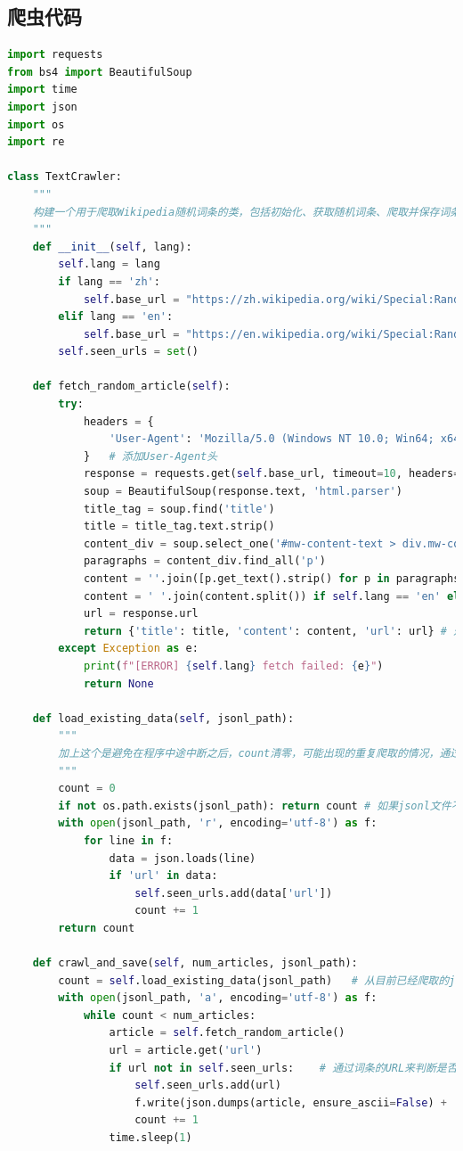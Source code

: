 \documentclass[11pt]{article}
\begin{document}
	\subsection{爬虫代码}
		\begin{lstlisting}[language=Python]
import requests
from bs4 import BeautifulSoup
import time
import json
import os 
import re

class TextCrawler:
	"""
	构建一个用于爬取Wikipedia随机词条的类，包括初始化、获取随机词条、爬取并保存词条等功能
	"""
	def __init__(self, lang):
		self.lang = lang
		if lang == 'zh':
			self.base_url = "https://zh.wikipedia.org/wiki/Special:Random?variant=zh-cn"    # 加上zh-cn确保爬下来的是大陆简体中文
		elif lang == 'en':
			self.base_url = "https://en.wikipedia.org/wiki/Special:Random"
		self.seen_urls = set()

	def fetch_random_article(self):
		try:
			headers = {
				'User-Agent': 'Mozilla/5.0 (Windows NT 10.0; Win64; x64) AppleWebKit/537.36 (KHTML, like Gecko) Chrome/129.0.0.0 Safari/537.36'
			}   # 添加User-Agent头
			response = requests.get(self.base_url, timeout=10, headers=headers)
			soup = BeautifulSoup(response.text, 'html.parser')
			title_tag = soup.find('title') 
			title = title_tag.text.strip()
			content_div = soup.select_one('#mw-content-text > div.mw-content-ltr.mw-parser-output')    # 直接定位到该路径
			paragraphs = content_div.find_all('p') 
			content = ''.join([p.get_text().strip() for p in paragraphs])
			content = ' '.join(content.split()) if self.lang == 'en' else re.sub(r'\s+', '', content)   # 分情况处理，英文需要用空格来分隔单词，中文直接可以把空白字符给去掉
			url = response.url
			return {'title': title, 'content': content, 'url': url} # 返回一个包含标题、内容和URL的字典，这是三个我们主要关心的内容
		except Exception as e:
			print(f"[ERROR] {self.lang} fetch failed: {e}")
			return None

	def load_existing_data(self, jsonl_path):
		"""
		加上这个是避免在程序中途中断之后，count清零，可能出现的重复爬取的情况，通过读取jsonl文件（如果存在）来确认目前已经爬取的词条数
		"""
		count = 0
		if not os.path.exists(jsonl_path): return count # 如果jsonl文件不存在说明程序第一次启动
		with open(jsonl_path, 'r', encoding='utf-8') as f:
			for line in f:
				data = json.loads(line)
				if 'url' in data:
					self.seen_urls.add(data['url'])
					count += 1
		return count

	def crawl_and_save(self, num_articles, jsonl_path):
		count = self.load_existing_data(jsonl_path)   # 从目前已经爬取的jsonl文件中确认已经爬取的词条数量
		with open(jsonl_path, 'a', encoding='utf-8') as f: 
			while count < num_articles:
				article = self.fetch_random_article()
				url = article.get('url')
				if url not in self.seen_urls:    # 通过词条的URL来判断是否重复，只要没爬过的
					self.seen_urls.add(url)
					f.write(json.dumps(article, ensure_ascii=False) + '\n')
					count += 1
				time.sleep(1)


\end{lstlisting}
\end{document}

